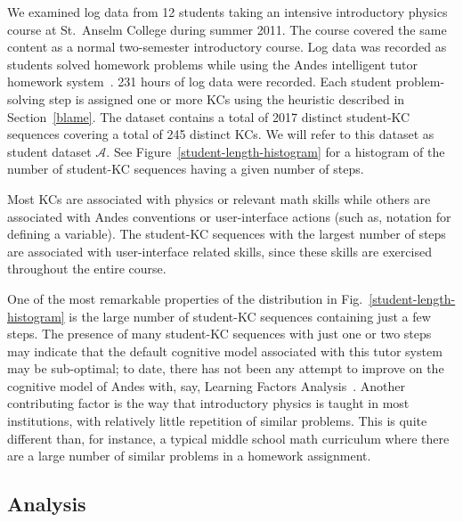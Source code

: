 \documentclass{edm_template}
\begin{document}
We examined log data from 12 students taking an intensive introductory
physics course at St.\ Anselm College during summer 2011.  The course
covered the same content as a normal two-semester introductory course.
Log data was recorded as students solved homework problems while using
the Andes intelligent tutor homework system~\cite{vanlehn_andes_2005}.  
231 hours of log data were recorded.
Each student problem-solving step is assigned one or more KCs
using the heuristic described in Section~\ref{blame}.
The dataset
contains a total of 2017 distinct student-KC sequences covering a total of
245 distinct KCs.  We will refer to this dataset as student dataset
$\mathcal{A}$.  See Figure~\ref{student-length-histogram} for a
histogram of the number of student-KC sequences having a given number of
steps.

Most KCs are associated with physics
or relevant math skills while others are associated with 
Andes conventions or user-interface actions (such as, notation
for defining a variable).  The student-KC sequences with the largest 
number of steps are associated with user-interface related skills,
since these skills are exercised throughout the entire course. 

One of the most remarkable properties of the distribution in
Fig.~\ref{student-length-histogram} is the large number of
student-KC sequences containing just a few steps.
The presence of many student-KC sequences with just one or two
steps may indicate that the default cognitive model associated 
with this tutor system may be sub-optimal; to date, there has not 
been any attempt to improve on the cognitive model of 
Andes with, say, Learning Factors Analysis~\cite{cen_learning_2006}.
Another contributing factor is the way that introductory physics is 
taught in most institutions, with relatively little repetition of 
similar problems.  This is quite different than, for instance, 
a typical middle school math curriculum where there are a large number
of similar problems in a homework assignment.

\subsection{Analysis}
\end{document}
